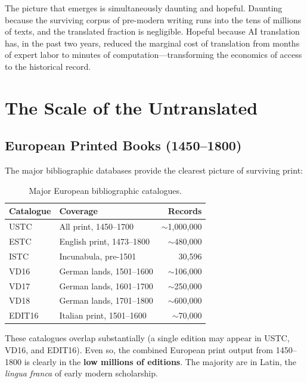 \documentclass[10pt,twocolumn]{article}
\begin{document}
The picture that emerges is simultaneously daunting and hopeful. Daunting because the surviving corpus of pre-modern writing runs into the tens of millions of texts, and the translated fraction is negligible. Hopeful because AI translation has, in the past two years, reduced the marginal cost of translation from months of expert labor to minutes of computation---transforming the economics of access to the historical record.

\section{The Scale of the Untranslated}

\subsection{European Printed Books (1450--1800)}

The major bibliographic databases provide the clearest picture of surviving print:

\begin{table}[H]
\small
\centering
\caption{Major European bibliographic catalogues.}
\label{tab:catalogues}
\begin{tabular}{@{}llr@{}}
\toprule
Catalogue & Coverage & Records \\
\midrule
USTC & All print, 1450--1700 & ${\sim}$1,000,000 \\
ESTC & English print, 1473--1800 & ${\sim}$480,000 \\
ISTC & Incunabula, pre-1501 & 30,596 \\
VD16 & German lands, 1501--1600 & ${\sim}$106,000 \\
VD17 & German lands, 1601--1700 & ${\sim}$250,000 \\
VD18 & German lands, 1701--1800 & ${\sim}$600,000 \\
EDIT16 & Italian print, 1501--1600 & ${\sim}$70,000 \\
\bottomrule
\end{tabular}
\end{table}

These catalogues overlap substantially (a single edition may appear in USTC, VD16, and EDIT16). Even so, the combined European print output from 1450--1800 is clearly in the \textbf{low millions of editions}. The majority are in Latin, the \emph{lingua franca} of early modern scholarship.
\end{document}
